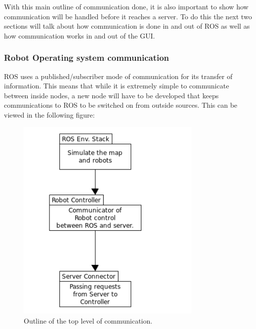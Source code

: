 \documentclass{report}
\begin{document}
      With this main outline of communication done, it is also important to show how communication will be handled before it reaches a server. To do this the next two sections will talk about how communication is done in and out of ROS as well as how communication works in and out of the GUI.

      \subsubsection{Robot Operating system communication}
        ROS uses a published/subscriber mode of communication for its transfer of information. This means that while it is extremely simple to communicate between inside nodes, a new node will have to be developed that keeps communications to ROS to be switched on from outside sources. This can be viewed in the following figure:

          \begin{figure}[!ht]  
            \centering
              \includegraphics[width=0.8\textwidth]{figures/RosCommunication.png}
              \caption{Outline of the top level of communication.}
          \end{figure}
\end{document}
